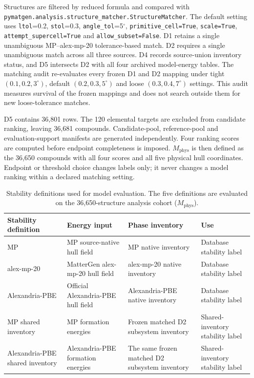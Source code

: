 \documentclass[twoside,twocolumn,9pt]{article}
\begin{document}
Structures are filtered by reduced formula and compared with \texttt{pymatgen.analysis.structure\_matcher.\allowbreak StructureMatcher}.\cite{ong2013python} The default setting uses \texttt{ltol}=0.2, \texttt{stol}=0.3, \texttt{angle\_tol}=5$^\circ$, \texttt{primitive\_cell=True}, \texttt{scale=True}, \texttt{attempt\_supercell=True} and \texttt{allow\_subset=False}. D1 retains a single unambiguous MP--alex-mp-20 tolerance-based match. D2 requires a single unambiguous match across all three sources. D4 records source-union inventory status, and D5 intersects D2 with all four archived model-energy tables. The matching audit re-evaluates every frozen D1 and D2 mapping under tight $(0.1,0.2,3^\circ)$, default $(0.2,0.3,5^\circ)$ and loose $(0.3,0.4,7^\circ)$ settings. This audit measures survival of the frozen mappings and does not search outside them for new loose-tolerance matches.

D5 contains 36,801 rows. The 120 elemental targets are excluded from candidate ranking, leaving 36,681 compounds. Candidate-pool, reference-pool and evaluation-support manifests are generated independently. Four ranking scores are computed before endpoint completeness is imposed. $M_{\mathrm{phys}}$ is then defined as the 36,650 compounds with all four scores and all five physical hull coordinates. Endpoint or threshold choice changes labels only; it never changes a model ranking within a declared matching setting.

\begin{table}[!t]
\centering
\caption{Stability definitions used for model evaluation. The five definitions are evaluated on the 36,650-structure analysis cohort ($M_{\mathrm{phys}}$).}
\label{tab:endpoint-definitions}
\small
\begin{tabular}{@{}p{}p{}p{}p{}@{}}
\toprule
Stability definition & Energy input & Phase inventory & Use \\
\midrule
MP & MP source-native hull field & MP native inventory & Database stability label \\
alex-mp-20 & MatterGen alex-mp-20 hull field & alex-mp-20 native inventory & Database stability label \\
Alexandria-PBE & Official Alexandria-PBE hull field & Alexandria-PBE native inventory & Database stability label \\
MP shared inventory & MP formation energies & Frozen matched D2 subsystem inventory & Shared-inventory stability label \\
Alexandria-PBE shared inventory & Alexandria-PBE formation energies & The same frozen matched D2 subsystem inventory & Shared-inventory stability label \\
\bottomrule
\end{tabular}
\end{table}
\end{document}
